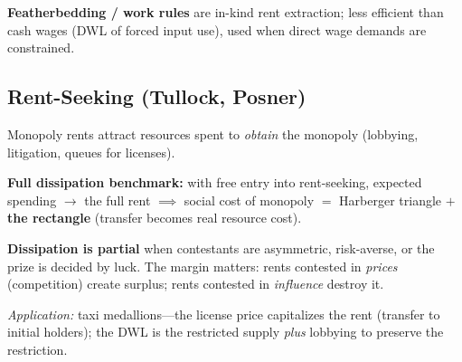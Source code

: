 \textbf{Featherbedding / work rules} are in-kind rent extraction; less efficient than cash wages (DWL of forced input use), used when direct wage demands are constrained.

\subsection{Rent-Seeking (Tullock, Posner)}
Monopoly rents attract resources spent to \textit{obtain} the monopoly (lobbying, litigation, queues for licenses).

\textbf{Full dissipation benchmark:} with free entry into rent-seeking, expected spending $\to$ the full rent $\implies$ social cost of monopoly $=$ Harberger triangle $+$ \textbf{the rectangle} (transfer becomes real resource cost).

\textbf{Dissipation is partial} when contestants are asymmetric, risk-averse, or the prize is decided by luck. The margin matters: rents contested in \textit{prices} (competition) create surplus; rents contested in \textit{influence} destroy it.

\textit{Application:} taxi medallions---the license price capitalizes the rent (transfer to initial holders); the DWL is the restricted supply \textit{plus} lobbying to preserve the restriction.
